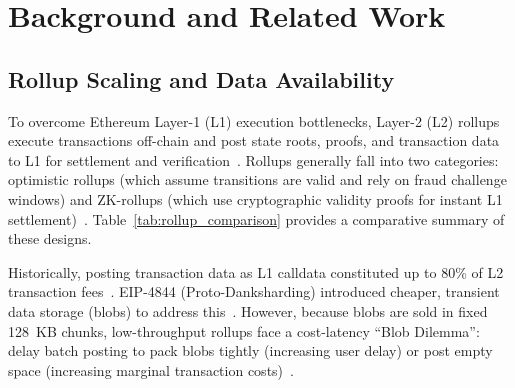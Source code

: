 \section{Background and Related Work}

\subsection{Rollup Scaling and Data Availability}
To overcome Ethereum Layer-1 (L1) execution bottlenecks, Layer-2 (L2) rollups execute transactions off-chain and post state roots, proofs, and transaction data to L1 for settlement and verification~\cite{poon2017plasma, buterin_horizon}. Rollups generally fall into two categories: optimistic rollups (which assume transitions are valid and rely on fraud challenge windows) and ZK-rollups (which use cryptographic validity proofs for instant L1 settlement)~\cite{ethereum_optimistic_rollups_docs, ethereum_zk_rollups_docs}. Table~\ref{tab:rollup_comparison} provides a comparative summary of these designs.

Historically, posting transaction data as L1 calldata constituted up to 80\% of L2 transaction fees~\cite{l2beat_fees, dune_eip4844}. EIP-4844 (Proto-Danksharding) introduced cheaper, transient data storage (blobs) to address this~\cite{eip4844, l2beat_dencun}. However, because blobs are sold in fixed 128~KB chunks, low-throughput rollups face a cost-latency ``Blob Dilemma'': delay batch posting to pack blobs tightly (increasing user delay) or post empty space (increasing marginal transaction costs)~\cite{adler2021data, werner2024analyzing}.

\begin{table}[h]
\centering
\caption{Comparison of Optimistic and ZK-Rollups}
\label{tab:rollup_comparison}
\end{table}

